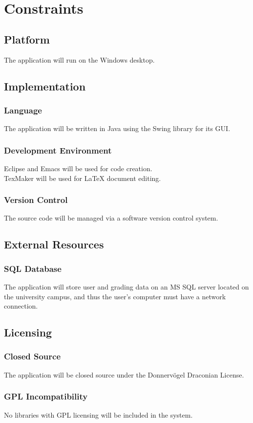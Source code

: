 \documentclass{article}
\begin{document}
\section{Constraints}
\subsection{Platform}
The application will run on the Windows desktop.
\subsection{Implementation}
\subsubsection{Language}
The application will be written in Java using the Swing library for its GUI.
\subsubsection{Development Environment}
Eclipse and Emacs will be used for code creation.\\
TexMaker will be used for {\LaTeX} document editing.
\subsubsection{Version Control}
The source code will be managed via a software version control system.
\subsection{External Resources}
\subsubsection{SQL Database}
The application will store user and grading data on an MS SQL server located on
the university campus, and thus the user's computer must have a network connection.
\subsection{Licensing}
\subsubsection{Closed Source}
The application will be closed source under the Donnervögel Draconian License.
\subsubsection{GPL Incompatibility}
No libraries with GPL licensing will be included in the system.
\end{document}
